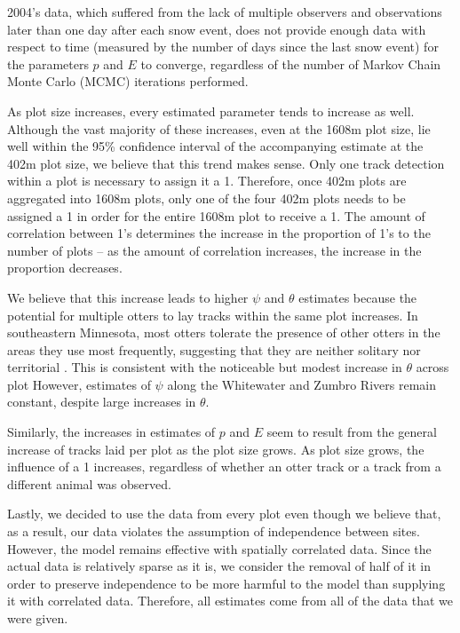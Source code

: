 \documentclass[12pt]{article}
\begin{document}
    2004's data, which suffered from the lack of multiple observers and
    observations later than one day after each snow event, does not provide
    enough data with respect to time (measured by the number of days since the
    last snow event) for the parameters \(p\) and \(E\) to converge, regardless
    of the number of Markov Chain Monte Carlo (MCMC) iterations performed.

    As plot size increases, every estimated parameter tends to increase as well.
    Although the vast majority of these increases, even at the 1608m plot size,
    lie well within the 95\% confidence interval of the accompanying estimate at
    the 402m plot size, we believe that this trend makes sense. Only one track
    detection within a plot is necessary to assign it a 1. Therefore, once 402m
    plots are aggregated into 1608m plots, only one of the four 402m plots needs
    to be assigned a 1 in order for the entire 1608m plot to receive a 1. The
    amount of correlation between 1's determines the increase in the proportion
    of 1's to the number of plots -- as the amount of correlation increases, the
    increase in the proportion decreases.

    We believe that this increase leads to higher \(\psi\) and \(\theta\)
    estimates because the potential for multiple otters to lay tracks within the
    same plot increases. In southeastern Minnesota, most otters tolerate the
    presence of other otters in the areas they use most frequently, suggesting
    that they are neither solitary nor territorial \cite{Gorman2006}. This is
    consistent with the noticeable but modest increase in \(\theta\) across plot
    However, estimates of \(\psi\) along the Whitewater and Zumbro Rivers remain
    constant, despite large increases in \(\theta\).

    Similarly, the increases in estimates of \(p\) and \(E\) seem to result from
    the general increase of tracks laid per plot as the plot size grows. As plot
    size grows, the influence of a 1 increases, regardless of whether an otter
    track or a track from a different animal was observed.

    Lastly, we decided to use the data from every plot even though we believe
    that, as a result, our data violates the assumption of independence between
    sites. However, the model remains effective with spatially correlated data.
    Since the actual data is relatively sparse as it is, we consider the removal
    of half of it in order to preserve independence to be more harmful to the
    model than supplying it with correlated data. Therefore, all estimates come
    from all of the data that we were given.
\end{document}

